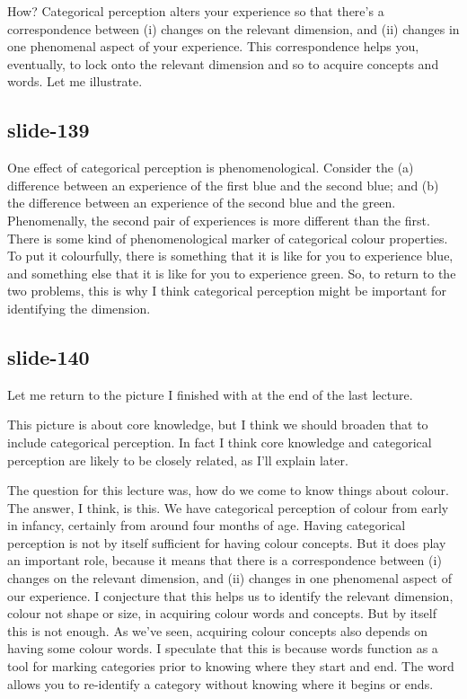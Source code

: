 \documentclass[12pt,\papersize]{extarticle}
\begin{document}
How?
Categorical perception alters your experience so that there's a correspondence between
(i) changes on the relevant dimension, and (ii) changes in one phenomenal aspect of your
experience.
This correspondence helps you, eventually, to lock onto the relevant dimension and so to
acquire concepts and words.
Let me illustrate.

\subsection{slide-139}
One effect of categorical perception is phenomenological.
Consider the (a) difference between an experience of the first blue and the second blue;
and (b) the difference between an experience of the second blue and the green.
Phenomenally, the second pair of experiences is more different than the first.
There is some kind of phenomenological marker of categorical colour properties.
To put it colourfully, there is something that it is like for you to experience blue, and something else that it is like for you to experience green.
So, to return to the two problems, this is why I think categorical perception might be important for identifying the dimension.

\subsection{slide-140}
Let me return to the picture I finished with at the end of the last lecture.

This picture is about core knowledge, but I think we should broaden that to include categorical perception.
In fact I think core knowledge and categorical perception are likely to be closely related, as I'll explain later.

The question for this lecture was, how do we come to know things about colour.
The answer, I think, is this.
We have categorical perception of colour from early in infancy, certainly from around four months of age.
Having categorical perception is not by itself sufficient for having colour concepts.
But it does play an important role, because it means that there is
a correspondence between (i) changes on the relevant dimension, and (ii) changes in one phenomenal aspect of our experience.
I conjecture that this helps us to identify the relevant dimension, colour not shape or size, in acquiring colour words and concepts.
But by itself this is not enough.
As we've seen, acquiring colour concepts also depends on having some colour words.
I speculate that this is because words function as a tool for marking categories prior to knowing where they start and end.
The word allows you to re-identify a category without knowing where it begins or ends.
\end{document}
